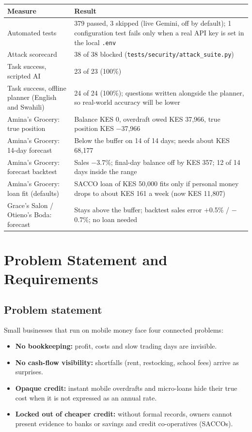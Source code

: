 \documentclass[10pt,a4paper]{article}
\newcommand{\code}[1]{\texttt{\small #1}}
\begin{document}
\begin{center}
\begin{tabularx}{\textwidth}{@{}p{6.6cm}Y@{}}
\toprule
\textbf{Measure} & \textbf{Result}\\
\midrule
Automated tests & 379 passed, 3 skipped (live Gemini, off by default); 1 configuration test fails only when a real API key is set in the local \code{.env}\\
Attack scorecard & 38 of 38 blocked (\code{tests/security/attack\_suite.py})\\
Task success, scripted AI & 23 of 23 (100\%)\\
Task success, offline planner (English and Swahili) & 24 of 24 (100\%); questions written alongside the planner, so real-world accuracy will be lower\\
Amina's Grocery: true position & Balance KES 0, overdraft owed KES 37{,}966, true position KES $-$37{,}966\\
Amina's Grocery: 14-day forecast & Below the buffer on 14 of 14 days; needs about KES 68{,}177\\
Amina's Grocery: forecast backtest & Sales $-$3.7\%; final-day balance off by KES 357; 12 of 14 days inside the range\\
Amina's Grocery: loan fit (defaults) & SACCO loan of KES 50{,}000 fits only if personal money drops to about KES 161 a week (now KES 11{,}807)\\
Grace's Salon / Otieno's Boda: forecast & Stays above the buffer; backtest sales error $+$0.5\% / $-$0.7\%; no loan needed\\
\bottomrule
\end{tabularx}
\end{center}

\section{Problem Statement and Requirements}

\subsection{Problem statement}
Small businesses that run on mobile money face four connected problems:
\begin{itemize}
  \item \textbf{No bookkeeping:} profit, costs and slow trading days are invisible.
  \item \textbf{No cash-flow visibility:} shortfalls (rent, restocking, school fees) arrive as surprises.
  \item \textbf{Opaque credit:} instant mobile overdrafts and micro-loans hide their true cost when it is not expressed as an annual rate.
  \item \textbf{Locked out of cheaper credit:} without formal records, owners cannot present evidence to banks or savings and credit co-operatives (SACCOs).
\end{itemize}
\end{document}

